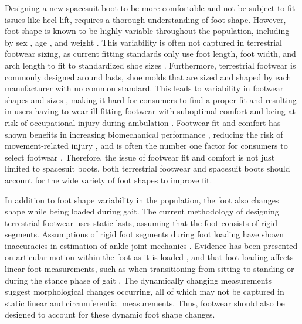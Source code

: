 \documentclass[defaultstyle,11pt]{thesis}
\begin{document}
Designing a new spacesuit boot to be more comfortable and not be subject to fit issues like heel-lift, requires a thorough understanding of foot shape.
However, foot shape is known to be highly variable throughout the population, including by sex \citep{Wunderlich2001, Krauss2008, Krauss2010}, age \citep{Tomassoni2014}, and weight \citep{Price2016}.
This variability is often not captured in terrestrial footwear sizing, as current fitting standards only use foot length, foot width, and arch length to fit to standardized shoe sizes \citep{ASTM2017}.
Furthermore, terrestrial footwear is commonly designed around lasts, shoe molds that are sized and shaped by each manufacturer with no common standard.
This leads to variability in footwear shapes and sizes \citep{Jurca2013, Wannop2019}, making it hard for consumers to find a proper fit and resulting in users having to wear ill-fitting footwear with suboptimal comfort and being at risk of occupational injury during ambulation \citep{Dobson2018b}.
Footwear fit and comfort has shown benefits in increasing biomechanical performance \citep{Pryhoda2021}, reducing the risk of movement-related injury \citep{Mundermann2001a}, and is often the number one factor for consumers to select footwear \citep{Martinez-Martinez2017}.
Therefore, the issue of footwear fit and comfort is not just limited to spacesuit boots, both terrestrial footwear and spacesuit boots should account for the wide variety of foot shapes to improve fit.

In addition to foot shape variability in the population, the foot also changes shape while being loaded during gait.
The current methodology of designing terrestrial footwear uses static lasts, assuming that the foot consists of rigid segments.
Assumptions of rigid foot segments during foot loading have shown inaccuracies in estimation of ankle joint mechanics \citep{Zelik2018, Kessler2020}.
Evidence has been presented on articular motion within the foot as it is loaded \citep{Lundgren2008, Wolf2008}, and that foot loading affects linear foot measurements, such as when transitioning from sitting to standing \citep{Xiong2009, Oladipo2008} or during the stance phase of gait \citep{Kouchi2009, Barisch-Fritz2014, Grau2018}.
The dynamically changing measurements suggest morphological changes occurring, all of which may not be captured in static linear and circumferential measurements.
Thus, footwear should also be designed to account for these dynamic foot shape changes.
\end{document}
